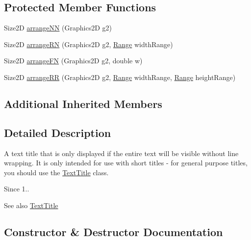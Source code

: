 \subsection*{Protected Member Functions}
\begin{DoxyCompactItemize}
\item 
Size2D \mbox{\hyperlink{classorg_1_1jfree_1_1chart_1_1title_1_1_short_text_title_a5b423c038031bfa59c4a73fa595a033f}{arrange\+NN}} (Graphics2D g2)
\item 
Size2D \mbox{\hyperlink{classorg_1_1jfree_1_1chart_1_1title_1_1_short_text_title_af41e50ecbad106369c3a6718785c2915}{arrange\+RN}} (Graphics2D g2, \mbox{\hyperlink{classorg_1_1jfree_1_1data_1_1_range}{Range}} width\+Range)
\item 
Size2D \mbox{\hyperlink{classorg_1_1jfree_1_1chart_1_1title_1_1_short_text_title_a0430c8589779585237859f4449d74e17}{arrange\+FN}} (Graphics2D g2, double w)
\item 
Size2D \mbox{\hyperlink{classorg_1_1jfree_1_1chart_1_1title_1_1_short_text_title_a0b79990e0d67ac4c313e2199f61aca9c}{arrange\+RR}} (Graphics2D g2, \mbox{\hyperlink{classorg_1_1jfree_1_1data_1_1_range}{Range}} width\+Range, \mbox{\hyperlink{classorg_1_1jfree_1_1data_1_1_range}{Range}} height\+Range)
\end{DoxyCompactItemize}
\subsection*{Additional Inherited Members}


\subsection{Detailed Description}
A text title that is only displayed if the entire text will be visible without line wrapping. It is only intended for use with short titles -\/ for general purpose titles, you should use the \mbox{\hyperlink{classorg_1_1jfree_1_1chart_1_1title_1_1_text_title}{Text\+Title}} class.

\begin{DoxySince}{Since}
1..
\end{DoxySince}
\begin{DoxySeeAlso}{See also}
\mbox{\hyperlink{classorg_1_1jfree_1_1chart_1_1title_1_1_text_title}{Text\+Title}} 
\end{DoxySeeAlso}


\subsection{Constructor \& Destructor Documentation}
\mbox{\label{classorg_1_1jfree_1_1chart_1_1title_1_1_short_text_title_af7c63f8c49b6ef980b2ed7414e74d6a6}} 
